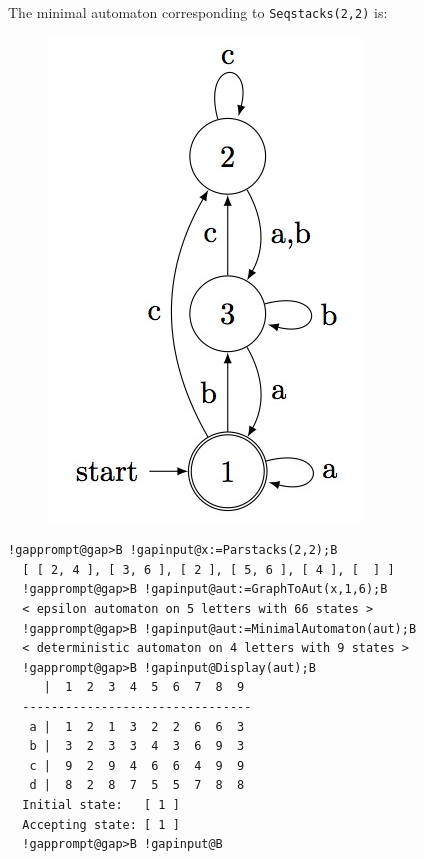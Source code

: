 \documentclass[a4paper,11pt]{report}
\begin{document}
{{{      The minimal automaton corresponding to \texttt{Seqstacks(2,2)} is:
      \begin{figure}[H] \begin{center} \leavevmode \includegraphics[scale=0.75]{img/ss22aut.jpg} \end{center} \end{figure}
      
\begin{Verbatim}[commandchars=!@B,fontsize=\small,frame=single,label=Example]
  !gapprompt@gap>B !gapinput@x:=Parstacks(2,2);B
  [ [ 2, 4 ], [ 3, 6 ], [ 2 ], [ 5, 6 ], [ 4 ], [  ] ]
  !gapprompt@gap>B !gapinput@aut:=GraphToAut(x,1,6);B
  < epsilon automaton on 5 letters with 66 states >
  !gapprompt@gap>B !gapinput@aut:=MinimalAutomaton(aut);B
  < deterministic automaton on 4 letters with 9 states >
  !gapprompt@gap>B !gapinput@Display(aut);B
     |  1  2  3  4  5  6  7  8  9  
  --------------------------------
   a |  1  2  1  3  2  2  6  6  3  
   b |  3  2  3  3  4  3  6  9  3  
   c |  9  2  9  4  6  6  4  9  9  
   d |  8  2  8  7  5  5  7  8  8  
  Initial state:   [ 1 ]
  Accepting state: [ 1 ]
  !gapprompt@gap>B !gapinput@B
\end{Verbatim}
 
}}}
\end{document}
